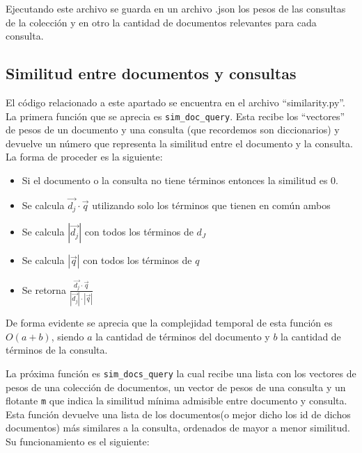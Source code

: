 \documentclass[runningheads]{llncs}
\begin{document}
	Ejecutando este archivo se guarda en un archivo .json los pesos de las consultas de la colecci\'on y en otro la cantidad de documentos relevantes para cada consulta.
	
	\subsection{Similitud entre documentos y consultas}
	
	El c\'odigo relacionado  a este apartado se encuentra en el archivo ``similarity.py''. La primera funci\'on que se aprecia es \verb|sim_doc_query|. Esta recibe los ``vectores'' de pesos de un documento y una consulta (que recordemos son diccionarios) y devuelve un n\'umero que representa la similitud entre el documento y la consulta. La forma de proceder es la siguiente:
	
	\begin{itemize}
		\item Si el documento o la consulta no tiene t\'erminos entonces la similitud es 0.
		
		\item Se calcula $\overrightarrow{d_j}\cdot\overrightarrow{q}$ utilizando solo los t\'erminos que tienen en com\'un ambos
		
		\item Se calcula $|\overrightarrow{d_j}|$ con todos los t\'erminos de $d_J$
		
		\item Se calcula $|\overrightarrow{q}|$ con todos los t\'erminos de $q$
		
		\item Se retorna $\frac{\overrightarrow{d_j}\cdot\overrightarrow{q}}{|\overrightarrow{d_j}|\cdot|\overrightarrow{q}|}$
	\end{itemize}
	
	De forma evidente se aprecia que la complejidad temporal de esta funci\'on es $O(a + b)$, siendo $a$ la cantidad de t\'erminos del documento y $b$ la cantidad de t\'erminos de la consulta.
		
	La pr\'oxima funci\'on es \verb|sim_docs_query| la cual recibe una lista con los vectores de pesos de una colecci\'on de documentos, un vector de pesos de una consulta y un flotante \verb|m| que indica la similitud m\'inima admisible entre documento y consulta. Esta funci\'on devuelve una lista de los documentos(o mejor dicho los id de dichos documentos) m\'as similares a la consulta, ordenados de mayor a menor similitud. Su funcionamiento es el siguiente:
	
\end{document}
